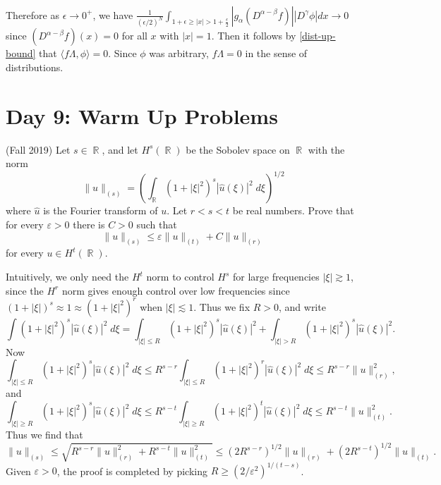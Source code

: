 \documentclass[answers]{exam}
\DeclareMathOperator{\RR}{\mathbb{R}}
\theoremstyle{problemstyle}
\newcommand{\1}[1]{\textbf{1}_{\left[#1\right]}} %
\begin{document}
\begin{questions}
\begin{parts}
\begin{solution}
\begin{align*}
    \end{align*}
    Therefore as $\epsilon\to 0^+$, we have $\frac{1}{(\epsilon/2)^N}\int_{1+ \epsilon\geq |x|>1+\frac{\epsilon}{2}} \left| g_{\alpha}(D^{\alpha-\beta}f)\right| \left| D^{\gamma}\phi \right|dx \to 0$ since $(D^{\alpha-\beta}f)(x)=0$ for all $x$ with $|x|=1$. Then it follows by \eqref{dist-up-bound} that $\langle f\Lambda, \phi\rangle = 0$. Since $\phi$ was arbitrary, $f\Lambda=0$ in the sense of distributions.
  \end{solution}
\end{parts}





\newpage
\section*{Day 9: Warm Up Problems}

\question (Fall 2019)
    Let $s \in \RR$, and let $H^s(\RR)$ be the Sobolev space on $\RR$ with the norm
    \[ \| u \|_{(s)} = \left( \int_{\RR} (1 + |\xi|^2)^s |\widehat{u}(\xi)|^2\; d\xi \right)^{1/2} \]
    where $\widehat{u}$ is the Fourier transform of $u$. Let $r < s < t$ be real numbers. Prove that for every $\varepsilon > 0$ there is $C > 0$ such that
    \[ \| u \|_{(s)} \leq \varepsilon \| u \|_{(t)} + C \| u \|_{(r)} \]
    for every $u \in H^t(\RR)$.
\begin{solution}
    Intuitively, we only need the $H^t$ norm to control $H^s$ for large frequencies $|\xi| \gtrsim 1$, since the $H^r$ norm gives enough control over low frequencies since $(1 + |\xi|)^s \approx 1 \approx (1 + |\xi|^2)^r$ when $|\xi| \lesssim 1$. Thus we fix $R > 0$, and write
    \[ \int (1 + |\xi|^2)^s |\widehat{u}(\xi)|^2\; d\xi = \int_{|\xi| \leq R} (1 + |\xi|^2)^s |\widehat{u}(\xi)|^2 + \int_{|\xi| > R} (1 + |\xi|^2)^s |\widehat{u}(\xi)|^2. \]
    Now
    \[ \int_{|\xi| \leq R} (1 + |\xi|^2)^s |\widehat{u}(\xi)|^2\; d\xi \leq R^{s-r} \int_{|\xi| \leq R} (1 + |\xi|^2)^r |\widehat{u}(\xi)|^2\; d\xi \leq R^{s-r} \| u \|_{(r)}^2, \]
    and
    \[ \int_{|\xi| \geq R} (1 + |\xi|^2)^s |\widehat{u}(\xi)|^2\; d\xi \leq R^{s-t} \int_{|\xi| \geq R} (1 + |\xi|^2)^t |\widehat{u}(\xi)|^2\; d\xi \leq R^{s-t} \| u \|_{(t)}^2. \]
    Thus we find that
    \[ \| u \|_{(s)} \leq \sqrt{R^{s-r} \| u \|_{(r)}^2 + R^{s-t} \| u \|_{(t)}^2} \leq (2R^{s-r})^{1/2} \| u \|_{(r)} + (2R^{s-t})^{1/2} \| u \|_{(t)}.  \]
    Given $\varepsilon > 0$, the proof is completed by picking $R \geq (2/\varepsilon^2)^{1/(t-s)}$.


\end{solution}
\end{questions}
\end{document}
